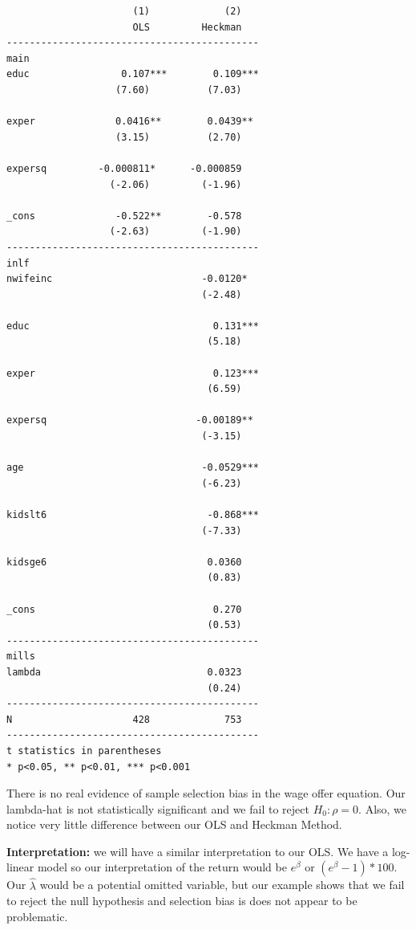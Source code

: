 \documentclass[
]{book}
\begin{document}
\begin{verbatim}
                      (1)             (2)   
                      OLS         Heckman   
--------------------------------------------
main                                        
educ                0.107***        0.109***
                   (7.60)          (7.03)   

exper              0.0416**        0.0439** 
                   (3.15)          (2.70)   

expersq         -0.000811*      -0.000859   
                  (-2.06)         (-1.96)   

_cons              -0.522**        -0.578   
                  (-2.63)         (-1.90)   
--------------------------------------------
inlf                                        
nwifeinc                          -0.0120*  
                                  (-2.48)   

educ                                0.131***
                                   (5.18)   

exper                               0.123***
                                   (6.59)   

expersq                          -0.00189** 
                                  (-3.15)   

age                               -0.0529***
                                  (-6.23)   

kidslt6                            -0.868***
                                  (-7.33)   

kidsge6                            0.0360   
                                   (0.83)   

_cons                               0.270   
                                   (0.53)   
--------------------------------------------
mills                                       
lambda                             0.0323   
                                   (0.24)   
--------------------------------------------
N                     428             753   
--------------------------------------------
t statistics in parentheses
* p<0.05, ** p<0.01, *** p<0.001
\end{verbatim}

There is no real evidence of sample selection bias in the wage offer equation.
Our lambda-hat is not statistically significant and we fail to reject \(H_0: \rho=0\). Also, we notice very little difference between our OLS and Heckman Method.

\textbf{Interpretation:} we will have a similar interpretation to our OLS. We have a log-linear model so our interpretation of the return would be \(e^\beta\) or \((e^\beta-1)*100\). Our \(\hat{\lambda}\) would be a potential omitted variable, but our example shows that we fail to reject the null hypothesis and selection bias is does not appear to be problematic.
\end{document}
